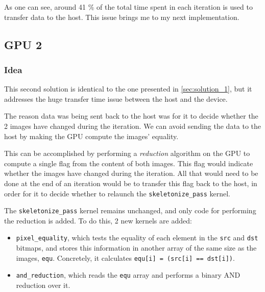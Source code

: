 \documentclass[11pt,a4paper]{article}
\begin{document}

                As one can see, around 41 \% of the total time spent in each iteration is used to transfer data to the host.
                This issue brings me to my next implementation.

        \subsection{GPU 2}
            \label{sec:solution_2}

            \subsubsection{Idea}
                This second solution is identical to the one presented in \ref{sec:solution_1}, but it addresses the huge transfer time issue between the host and the device.

                The reason data was being sent back to the host was for it to decide whether the 2 images have changed during the iteration.
                We can avoid sending the data to the host by making the GPU compute the images' equality.

                This can be accomplished by performing a \emph{reduction} algorithm on the GPU to compute a single flag from the content of both images.
                This flag would indicate whether the images have changed during the iteration.
                All that would need to be done at the end of an iteration would be to transfer this flag back to the host, in order for it to decide whether to relaunch the \verb+skeletonize_pass+ kernel.


                The \verb+skeletonize_pass+ kernel remains unchanged, and only code for performing the reduction is added.
                To do this, 2 new kernels are added:
                \begin{itemize}
                    \item \verb+pixel_equality+, which tests the equality of each element in the \verb+src+ and \verb+dst+ bitmaps, and stores this information in another array of the same size as the images, \verb+equ+. Concretely, it calculates \verb+equ[i] = (src[i] == dst[i])+.
                    \item \verb+and_reduction+, which reads the \verb+equ+ array and performs a binary AND reduction over it.
                \end{itemize}
\end{document}
